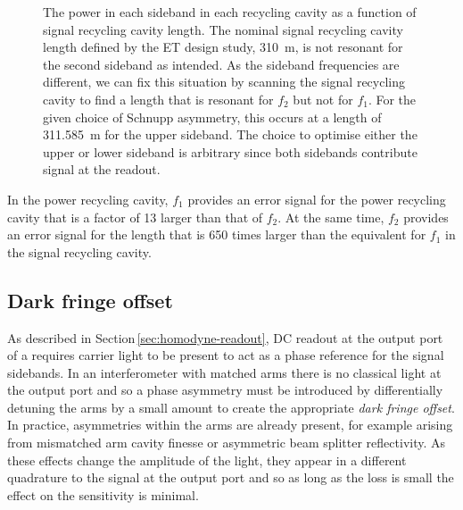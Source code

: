 \begin{figure}
  \centering
  
  \caption[Power of the control sidebands in the signal recycling cavity of \ETLF{} in detuned configuration as a function of signal recycling cavity length]{\label{fig:sideband-powers-srcl-detuned}The power in each sideband in each recycling cavity as a function of signal recycling cavity length. The nominal signal recycling cavity length defined by the \gls{ET} design study, \SI{310}{\meter}, is not resonant for the second sideband as intended. As the sideband frequencies are different, we can fix this situation by scanning the signal recycling cavity to find a length that is resonant for $f_2$ but not for $f_1$. For the given choice of Schnupp asymmetry, this occurs at a length of \SI{311.585}{\meter} for the upper sideband. The choice to optimise either the upper or lower sideband is arbitrary since both sidebands contribute signal at the readout.}
\end{figure}

In the power recycling cavity, $f_1$ provides an error signal for the power recycling cavity that is a factor of \num{13} larger than that of $f_2$. At the same time, $f_2$ provides an error signal for the length that is \num{650} times larger than the equivalent for $f_1$ in the signal recycling cavity.

\subsection{Dark fringe offset}
As described in Section\,\ref{sec:homodyne-readout}, \gls{DC} readout at the output port of a \DRFPMI{} requires carrier light to be present to act as a phase reference for the signal sidebands. In an interferometer with matched arms there is no classical light at the output port and so a phase asymmetry must be introduced by differentially detuning the arms by a small amount to create the appropriate \emph{dark fringe offset}. In practice, asymmetries within the arms are already present, for example arising from mismatched arm cavity finesse or asymmetric beam splitter reflectivity. As these effects change the amplitude of the light, they appear in a different quadrature to the signal at the output port and so as long as the loss is small the effect on the sensitivity is minimal.

